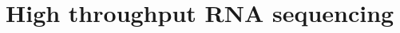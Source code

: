 \documentclass[]{ntnuthesis}
\begin{document}
\section{High throughput RNA sequencing}









%
\end{document}
